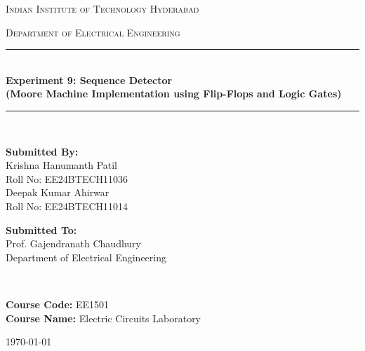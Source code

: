 \documentclass[a4paper,12pt]{article}
\begin{document}
\begin{titlepage}
    \centering
    \vspace*{1cm}
    
    {\scshape\LARGE Indian Institute of Technology Hyderabad \par}
    \vspace{0.5cm}
    {\scshape\Large Department of Electrical Engineering \par}
    \vspace{1.5cm}
    
    \rule{\linewidth}{0.5mm} \\[0.4cm]
    { \huge \bfseries Experiment 9: Sequence Detector \\[0.3cm]
      \Large (Moore Machine Implementation using Flip-Flops and Logic Gates) }\\[0.4cm]
    \rule{\linewidth}{0.5mm} \\[2cm]
    
    \begin{minipage}{0.45\textwidth}
        \begin{flushleft} \large
        \textbf{Submitted By:}\\
        Krishna Hanumanth Patil \\
        Roll No: EE24BTECH11036 \\
        Deepak Kumar Ahirwar \\
        Roll No: EE24BTECH11014 \\
        \end{flushleft}
    \end{minipage}%
    \hfill
    \begin{minipage}{0.45\textwidth}
        \begin{flushright} \large
        \textbf{Submitted To:} \\
        Prof. Gajendranath Chaudhury \\
        Department of Electrical Engineering \\
        \end{flushright}
    \end{minipage}\\[2cm]
    
    \begin{center}
        \textbf{Course Code:} EE1501\\
        \textbf{Course Name:} Electric Circuits Laboratory \\
        \vfill
        {\large \today\par}
    \end{center}
\end{titlepage}
\end{document}
